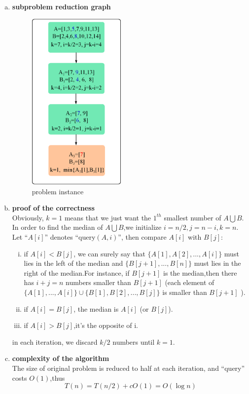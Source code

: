 \begin{enumerate}[a).]
\item \textbf{subproblem reduction graph}
\begin{figure}[H]
\centering
\includegraphics[width=0.45\textwidth,height=0.4\textheight]{pictures/graph_median}	
\caption{problem instance}
\end{figure}
\item \textbf{proof of the correctness} \\
Obviously, $k = 1$ means that we just want the $1^{th}$ smallest number of
$A\bigcup B$.
In order to find the median of $A\bigcup B$,we initialize $i = n/2, j= n-i, k = n$.
Let ``$A[i]$'' denotes ``$\text{query}(A,i)$'',
then compare $A[i]$ with $B[j]$: 
\begin{enumerate}[i.]
	\item   if $A[i] < B[j]$, we can surely say that $\{A[1],A[2],...,A[i]\}$ must lies in the left of 
		  the median and $\{B[j+1],...,B[n]\}$ must lies in the right of the median.For instance,
		  if $B[j+1]$ is the median,then there has $i+j=n$ numbers smaller than $B[j+1]$
		   (each element of $\{A[1],...,A[i]\}\cup \{B[1],B[2],...,B[j]\}$ is smaller than $B[j+1]$
		   ).
	\item if $A[i] = B[j]$, the median is $A[i]$ (or $B[j]$).
	\item if $A[i] > B[j]$,it's the opposite of i. 	   		   
\end{enumerate}
in each iteration, we discard $k/2$ numbers until $k=1$.	

\item \textbf{complexity of the algorithm}  \\
The size of original problem is reduced to half at each iteration,
and ``query'' costs $O(1)$,thus \\
\[
T(n) = T(n/2) + cO(1) = O(\log n)
\]
	
\end{enumerate}